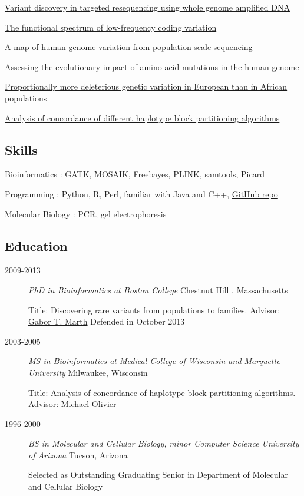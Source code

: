 \documentclass[]{article}
\begin{document}
\href{http://www.ncbi.nlm.nih.gov/pubmed/23837845}{Variant discovery in
targeted resequencing using whole genome amplified DNA}

\href{http://www.ncbi.nlm.nih.gov/pubmed/21917140}{The functional
spectrum of low-frequency coding variation}

\href{http://www.ncbi.nlm.nih.gov/pubmed/20981092}{A map of human genome
variation from population-scale sequencing}

\href{http://www.ncbi.nlm.nih.gov/pubmed/18516229}{Assessing the
evolutionary impact of amino acid mutations in the human genome}

\href{http://www.ncbi.nlm.nih.gov/pubmed/18288194}{Proportionally more
deleterious genetic variation in European than in African populations}

\href{http://www.ncbi.nlm.nih.gov/pubmed/16356172}{Analysis of
concordance of different haplotype block partitioning algorithms}

\subsection{Skills}\label{skills}

Bioinformatics : GATK, MOSAIK, Freebayes, PLINK, samtools, Picard

Programming : Python, R, Perl, familiar with Java and C++,
\href{https://github.com}{GitHub repo}

Molecular Biology : PCR, gel electrophoresis

\subsection{Education}\label{education}

\begin{description}
\item[2009-2013]
\emph{PhD in Bioinformatics at Boston College} Chestnut Hill ,
Massachusetts

Title: Discovering rare variants from populations to families. Advisor:
\href{http://bioinformatics.bc.edu/marthlab/wiki/index.php/Main_Page}{Gabor
T. Marth} Defended in October 2013
\item[2003-2005]
\emph{MS in Bioinformatics at Medical College of Wisconsin and Marquette
University} Milwaukee, Wisconsin

Title: Analysis of concordance of haplotype block partitioning
algorithms. Advisor: Michael Olivier
\item[1996-2000]
\emph{BS in Molecular and Cellular Biology, minor Computer Science
University of Arizona} Tucson, Arizona

Selected as Outstanding Graduating Senior in Department of Molecular and
Cellular Biology
\end{description}
\end{document}
